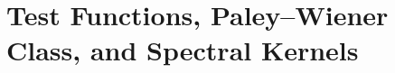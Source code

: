 
\section{Test Functions, Paley–Wiener Class, and Spectral Kernels} \label{sec:test-func-pw-spectral} \relax \hspace{0pt} %

